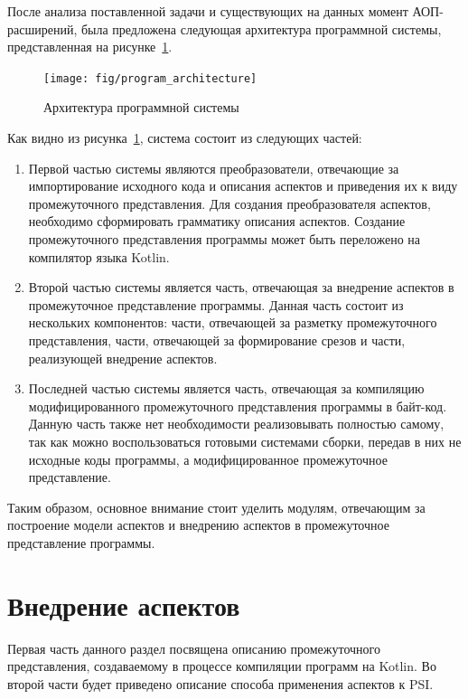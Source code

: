 После анализа поставленной задачи и существующих на данных момент
АОП-расширений, была предложена следующая архитектура программной системы,
представленная на рисунке~\ref{fig:program_architecture}.

\begin{figure}[htbp]
\centering
\texttt{[image: fig/program\_architecture]}
\caption{Архитектура программной системы}%
\label{fig:program_architecture}
\end{figure}

Как видно из рисунка~\ref{fig:program_architecture}, система состоит из
следующих частей:
\begin{enumerate}
	\item Первой частью системы являются преобразователи, отвечающие за
		 импортирование исходного кода и описания аспектов и приведения их к
		 виду промежуточного представления.
		 Для создания преобразователя аспектов, необходимо сформировать
		 грамматику описания аспектов.
		 Создание промежуточного представления программы может быть переложено
		 на компилятор языка Kotlin.
	\item Второй частью системы является часть, отвечающая за внедрение аспектов
		в промежуточное представление программы.
		Данная часть состоит из нескольких компонентов: части, отвечающей за
		разметку промежуточного представления, части, отвечающей за формирование
		срезов и части, реализующей внедрение аспектов.
	\item Последней частью системы является часть, отвечающая за компиляцию
		модифицированного промежуточного представления программы в байт-код.
		Данную часть также нет необходимости реализовывать полностью самому, так
		как можно воспользоваться готовыми системами сборки, передав в них
		не исходные коды программы, а модифицированное промежуточное
		представление.
\end{enumerate}

Таким образом, основное внимание стоит уделить модулям, отвечающим за построение
модели аспектов и внедрению аспектов в промежуточное представление программы.
\section{Внедрение аспектов}
\label{sub:custom_aspect_weaving}
Первая часть данного раздел посвящена описанию промежуточного представления,
создаваемому в процессе компиляции программ на Kotlin.
Во второй части будет приведено описание способа применения аспектов к PSI.
